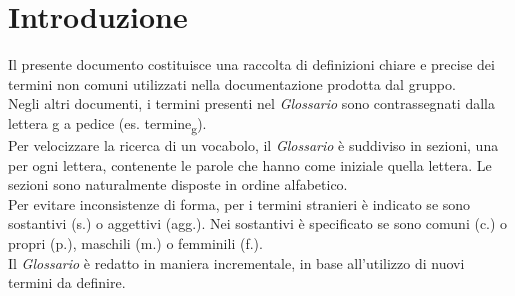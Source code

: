 \section*{Introduzione}
    Il presente documento costituisce una raccolta di definizioni chiare e precise dei termini non
    comuni utilizzati nella documentazione prodotta dal gruppo. \\
    Negli altri documenti, i termini presenti nel \textit{Glossario} sono contrassegnati dalla lettera g a pedice (es. termine\textsubscript{g}).\\
    Per velocizzare la ricerca di un vocabolo, il \textit{Glossario} è suddiviso in sezioni,
    una per ogni lettera, contenente le parole che hanno come iniziale quella lettera. Le sezioni sono 
    naturalmente disposte in ordine alfabetico.\\
    Per evitare inconsistenze di forma, per i termini stranieri è indicato se sono sostantivi (s.) o aggettivi (agg.).
    Nei sostantivi è specificato se sono comuni (c.) o propri (p.), maschili (m.) o femminili (f.).\\
    Il \textit{Glossario} è redatto in maniera incrementale, in base all'utilizzo
    di nuovi termini da definire.
